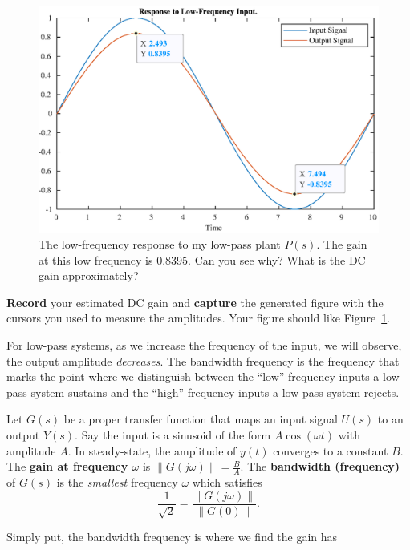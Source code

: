 \begin{figure}
  \includegraphics{images/Lab_1_LowFrequency.eps}
  \caption{The low-frequency response to my low-pass plant \(P(s).\) The gain
  at this low frequency is \(0.8395.\) Can you see why? What is the DC
  gain approximately?}
  \label{fig:lab1:lowfreq}
\end{figure}
%
\begin{deliverable}
  \textbf{Record} your estimated DC gain and \textbf{capture} the generated
  figure with the cursors you used to measure the amplitudes.
  Your figure should like Figure~\ref{fig:lab1:lowfreq}.
  \label{lab1:d1}
\end{deliverable}
%
For low-pass systems, as we increase the frequency of the input, we will
observe, the output amplitude \emph{decreases}. The bandwidth frequency
is the frequency that marks the point where we distinguish between the
``low'' frequency inputs a low-pass system sustains and the ``high'' frequency
inputs a low-pass system rejects.
%
\begin{definition}[Bandwidth]
  Let \(G(s)\) be a proper transfer function
  that maps an input signal \(U(s)\) to an output \(Y(s).\)
%
  Say the input is a sinusoid of the form \(A \cos(\omega t)\) with amplitude
  \(A.\) In steady-state, the amplitude of \(y(t)\) converges to a constant
  \(B.\) The \textbf{gain at frequency \(\omega\)} is
  \(\left\|G(j\omega)\right\| = \frac{B}{A}.\)
%
  The \textbf{bandwidth (frequency)} of \(G(s)\) is the \emph{smallest}
  frequency \(\omega\) which satisfies
  \[
    \frac{1}{\sqrt{2}} = \frac{\left\|G(j\omega)\right\|}{\left\|G(0)\right\|}.
  \]
\end{definition}
%
Simply put, the bandwidth frequency is where we find the gain has

